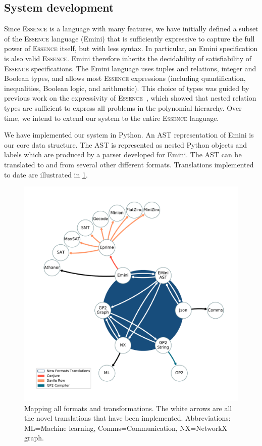\documentclass[a4paper,UKenglish,cleveref, autoref,pdfa]{lipics-v2021}
\newcommand{\essence}[0]{\textsc{Essence}\xspace}
\begin{document}
\subsection{System development}

Since \essence is a language with many features, we have initially defined a subset of the \essence language (Emini) that is sufficiently expressive to capture the full power of \essence itself, but with less syntax.
In particular, an Emini specification is also valid \essence.
Emini therefore inherits the decidability of satisfiability of \essence specifications.
The Emini language uses tuples and relations, integer and Boolean types, and allows most \essence expressions (including quantification, inequalities, Boolean logic, and arithmetic).
This choice of types was guided by previous work on the expressivity of \essence~\cite{Mitchell2008:expressive}, which showed that nested relation types are sufficient to express all problems in the polynomial hierarchy.
Over time, we intend to extend our system to the entire \essence language.

We have implemented our system in Python.
An AST representation of Emini is our core data structure. The AST is represented as nested Python objects and labels which are produced by a parser developed for Emini.
The AST can be translated to and from several other different formats.
Translations implemented to date are illustrated in \cref{fig:TMAP}.

\begin{figure}
\includegraphics[width=1\linewidth]{TMAP2.pdf}
\caption{Mapping all formats and transformations. The white arrows are all the novel translations that have been implemented. Abbreviations: ML=Machine learning, Comms=Communication, NX=NetworkX graph.}
\label{fig:TMAP}
\end{figure}
\end{document}
